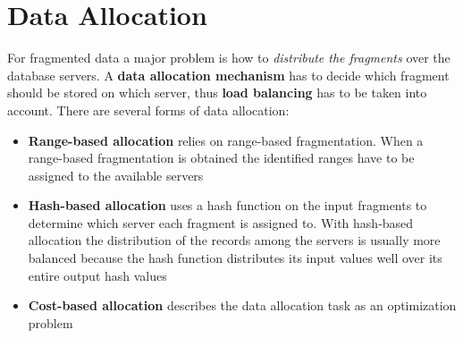 \section{Data Allocation}
For fragmented data a major problem is how to \textit{distribute the fragments} over the database servers. A \textbf{data allocation mechanism} has to decide which fragment should be stored on which server, thus \textbf{load balancing} has to be taken into account. There are several forms of data allocation:
\begin{itemize}
    \item \textbf{Range-based allocation} relies on range-based fragmentation. When a range-based fragmentation is obtained the identified ranges have to be assigned to the available servers
    \item \textbf{Hash-based allocation} uses a hash function on the input fragments to determine which server each fragment is assigned to. With hash-based allocation the distribution of the records among the servers is usually more balanced because the hash function distributes its input values well over its entire output hash values
    \item \textbf{Cost-based allocation} describes the data allocation task as an optimization problem
\end{itemize}

